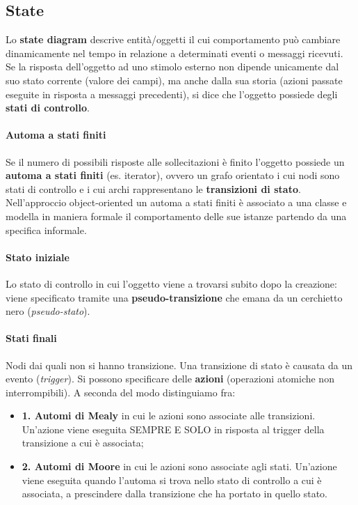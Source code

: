 \subsection{State}

Lo \textbf{state diagram} descrive entità/oggetti il cui comportamento può cambiare dinamicamente nel tempo in relazione a determinati eventi o messaggi ricevuti.\\

Se la risposta dell'oggetto ad uno stimolo esterno non dipende unicamente dal suo stato corrente (valore dei campi), ma anche dalla sua storia (azioni passate eseguite in risposta a messaggi precedenti), si dice che l'oggetto possiede degli \textbf{stati di controllo}.

\paragraph{Automa a stati finiti} Se il numero di possibili risposte alle sollecitazioni è finito l'oggetto possiede un \textbf{automa a stati finiti} (es. iterator), ovvero un grafo orientato i cui nodi sono stati di controllo e i cui archi rappresentano le \textbf{transizioni di stato}.\\
Nell'approccio object-oriented un automa a stati finiti è associato a una classe e modella in maniera formale il comportamento delle sue istanze partendo da una specifica informale.\\

\paragraph{Stato iniziale} Lo stato di controllo in cui l'oggetto viene a trovarsi subito dopo la creazione: viene specificato tramite una \textbf{pseudo-transizione} che emana da un cerchietto nero (\textit{pseudo-stato}).\\

\paragraph{Stati finali} Nodi dai quali non si hanno transizione. Una transizione di stato è causata da un evento (\textit{trigger}). Si possono specificare delle \textbf{azioni} (operazioni atomiche non interrompibili). A seconda del modo distinguiamo fra:
\begin{itemize}

    \item \textbf{1. Automi di Mealy} in cui le azioni sono associate alle transizioni. Un'azione viene eseguita SEMPRE E SOLO in risposta al trigger della transizione a cui è associata;

    \item  \textbf{2. Automi di Moore} in cui le azioni sono associate agli stati. Un'azione viene eseguita quando l'automa si trova nello stato di controllo a cui è associata, a prescindere dalla transizione che ha portato in quello stato.

\end{itemize}


